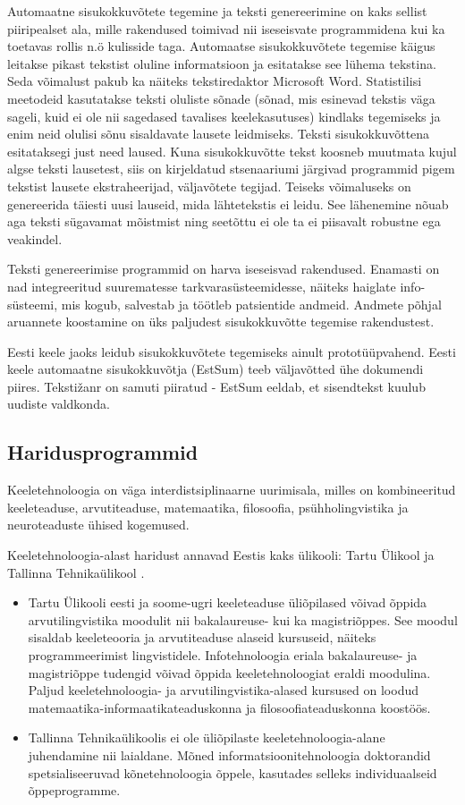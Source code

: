 \begin{multicols}{2}
Automaatne sisukokkuvõtete tegemine ja teksti genereerimine on kaks sellist piiripealset ala, mille rakendused toimivad nii iseseisvate programmidena kui ka toetavas rollis n.ö kulisside taga. 
Automaatse sisukokkuvõtete tegemise käigus leitakse pikast tekstist oluline informatsioon ja esitatakse see lühema tekstina. 
Seda võimalust pakub ka näiteks tekstiredaktor Microsoft Word. 
Statistilisi meetodeid kasutatakse teksti oluliste sõnade (sõnad, mis esinevad tekstis väga sageli, kuid ei ole nii sagedased tavalises keelekasutuses) kindlaks tegemiseks ja enim neid olulisi sõnu sisaldavate lausete leidmiseks. 
Teksti sisukokkuvõttena esitataksegi just need laused. 
Kuna sisukokkuvõtte tekst koosneb muutmata kujul algse teksti lausetest, siis on kirjeldatud stsenaariumi järgivad programmid pigem tekstist lausete ekstraheerijad, väljavõtete tegijad.
Teiseks võimaluseks on genereerida täiesti uusi lauseid, mida lähtetekstis ei leidu. 
See lähenemine nõuab aga teksti sügavamat mõistmist ning seetõttu ei ole ta ei piisavalt robustne ega veakindel. 

Teksti genereerimise programmid on harva iseseisvad rakendused. Enamasti on nad integreeritud suurematesse tarkvarasüsteemidesse, näiteks haiglate info- süsteemi, mis kogub, salvestab ja töötleb patsientide andmeid. 
Andmete põhjal aruannete koostamine on üks paljudest sisukokkuvõtte tegemise rakendustest. 

Eesti keele jaoks leidub sisukokkuvõtete tegemiseks ainult prototüüpvahend. 
Eesti keele automaatne sisukokkuvõtja (EstSum) teeb väljavõtted ühe dokumendi piires. Tekstižanr on samuti piiratud - EstSum eeldab, et sisendtekst kuulub uudiste valdkonda. 

\subsection{Haridusprogrammid}


Keeletehnoloogia on väga interdistsiplinaarne uurimisala, milles on kombineeritud keeleteaduse, arvutiteaduse, matemaatika, filosoofia, psühholingvistika ja neuroteaduste ühised kogemused. 

Keeletehnoloogia-alast haridust annavad Eestis kaks ülikooli: Tartu
Ülikool ja Tallinna Tehnikaülikool \cite{Meisteretal}.
\begin{itemize}
 \item Tartu Ülikooli eesti ja soome-ugri keeleteaduse üliõpilased võivad õppida arvutilingvistika moodulit nii bakalaureuse- kui ka magistriõppes. 
See moodul sisaldab keeleteooria ja arvutiteaduse alaseid kursuseid, näiteks programmeerimist lingvistidele. 
Infotehnoloogia eriala bakalaureuse- ja magistriõppe tudengid võivad õppida keeletehnoloogiat eraldi moodulina. 
Paljud keeletehnoloogia- ja arvutilingvistika-alased kursused on loodud matemaatika-informaatikateaduskonna ja filosoofiateaduskonna koostöös. 
 \item Tallinna Tehnikaülikoolis ei ole üliõpilaste keeletehnoloogia-alane juhendamine nii laialdane. 
Mõned informatsioonitehnoloogia doktorandid spetsialiseeruvad kõnetehnoloogia õppele, kasutades selleks indivi\-duaal\-seid õppeprogramme. 
\end{itemize}
  

\end{multicols}
